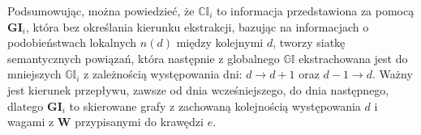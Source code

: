 Podsumowując, można powiedzieć, że $\mathbb{CI}_i$ to informacja przedstawiona za pomocą
$\mathbf{GI}_i$, która bez określania kierunku ekstrakcji, bazując na informacjach
o podobieństwach lokalnych $n(d)$ między kolejnymi $d$, tworzy siatkę semantycznych powiązań,
która następnie z globalnego $\mathbb{GI}$ ekstrachowana jest do mniejszych $\mathbb{GI}_i$
z zależnością występowania dni: $d \xrightarrow{} d+1$ oraz $d-1 \xrightarrow{} d$. 
Ważny jest kierunek przepływu, zawsze od dnia wcześniejszego, do dnia następnego, dlatego 
$\mathbf{GI}_i$ to skierowane grafy z zachowaną kolejnością występowania $d$ 
i wagami z $\mathbf{W}$ przypisanymi do krawędzi $e$.
